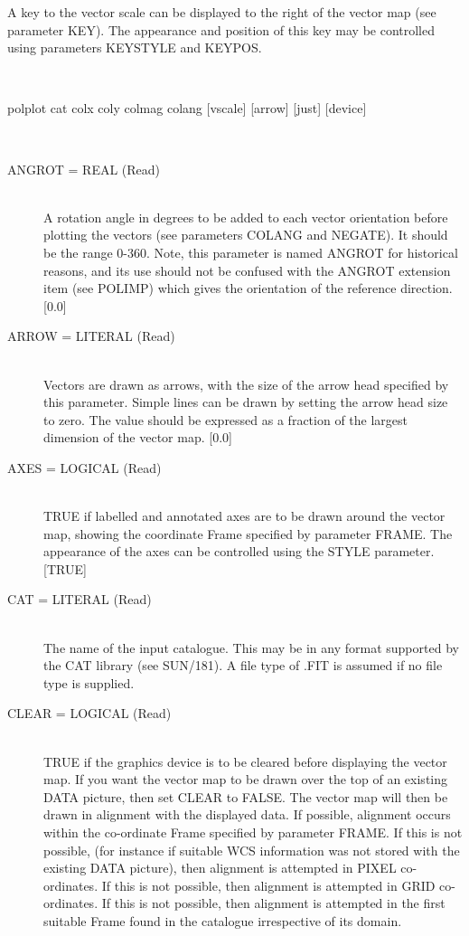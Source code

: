 \documentclass[twoside,11pt]{article}
\renewcommand{\_}{\texttt{\symbol{95}}}
\newcommand{\sstusage}[1]{\item[Usage:] \mbox{}
\\[1.3ex]{\raggedright \ssttt #1}}
\newcommand{\sstparameters}[1]{
   \item[Parameters:] \mbox{} \\
   \vspace{-3.5ex}
   \begin{description}
      #1
   \end{description}
}
\newcommand{\sstsubsection}[1]{ \item[{#1}] \mbox{} \\}
\newcommand{\sstusage}[1]{\item[Usage:]
      \begin{description}
         {\ssttt #1}
      \end{description}
      \\
   }
\newcommand{\sstparameters}[1]{
      \item[Parameters:] \\
      \begin{description}
         #1
      \end{description}
      \\
   }
\newcommand{\sstsubsection}[1]{\item[{#1}]}
\begin{document}
{{      A key to the vector scale can be displayed to the right of the
      vector map (see parameter KEY). The appearance and position of this
      key may be controlled using parameters KEYSTYLE and KEYPOS.
   }
   \sstusage{
      polplot cat colx coly colmag colang [vscale] [arrow] [just] [device]
   }
   \sstparameters{
      \sstsubsection{
         ANGROT = \_REAL (Read)
      }{
         A rotation angle in degrees to be added to each vector orientation
         before plotting the vectors (see parameters COLANG and NEGATE). It
         should be the range 0-360. Note, this parameter is named ANGROT
         for historical reasons, and its use should not be confused with
         the ANGROT extension item (see POLIMP) which gives the orientation
         of the reference direction. [0.0]
      }
      \sstsubsection{
         ARROW = LITERAL (Read)
      }{
         Vectors are drawn as arrows, with the size of the arrow head
         specified by this parameter. Simple lines can be drawn by setting
         the arrow head size to zero. The value should be expressed as a
         fraction of the largest dimension of the vector map. [0.0]
      }
      \sstsubsection{
         AXES = \_LOGICAL (Read)
      }{
         TRUE if labelled and annotated axes are to be drawn around the
         vector map, showing the coordinate Frame specified by parameter
         FRAME. The appearance of the axes can be controlled using
         the STYLE parameter. [TRUE]
      }
      \sstsubsection{
         CAT = LITERAL (Read)
      }{
         The name of the input catalogue. This may be in any format
         supported by the CAT library (see SUN/181). A file type of .FIT
         is assumed if no file type is supplied.
      }
      \sstsubsection{
         CLEAR = \_LOGICAL (Read)
      }{
         TRUE if the graphics device is to be cleared before displaying
         the vector map. If you want the vector map to be drawn over
         the top of an existing DATA picture, then set CLEAR to FALSE. The
         vector map will then be drawn in alignment with the displayed
         data. If possible, alignment occurs within the co-ordinate Frame
         specified by parameter FRAME. If this is not possible, (for instance
         if suitable WCS information was not stored with the existing DATA
         picture), then alignment is attempted in PIXEL co-ordinates. If this
         is not possible, then alignment is attempted in GRID co-ordinates. If
         this is not possible, then alignment is attempted in the first
         suitable Frame found in the catalogue irrespective of its domain.
}}}
\end{document}
